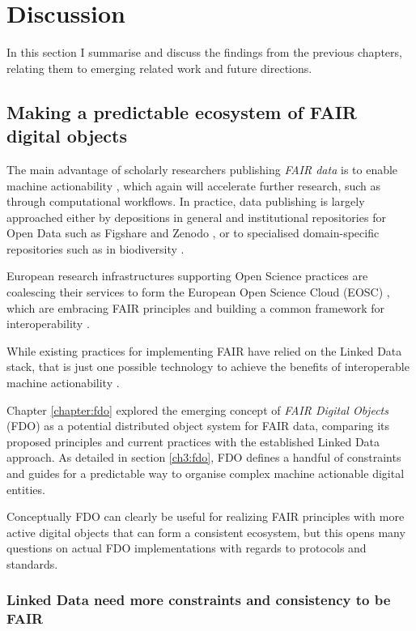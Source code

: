 \section{Discussion}
\label{ch61:discuss}

In this section I summarise and discuss the findings from the previous chapters, relating them to emerging related work and future directions.

\subsection{Making a predictable ecosystem of FAIR digital objects}
\label{ch61:ecosystem}

The main advantage of scholarly researchers publishing \emph{FAIR data} is to enable machine actionability \cite{Wilkinson 2016}, which again will accelerate further research, such as through computational workflows. 
In practice, data publishing is largely approached either by depositions in general and institutional repositories for Open Data such as Figshare and Zenodo \cite{Dillen 2019}, or to specialised domain-specific repositories such as in biodiversity \cite{ch8-7}. 

European research infrastructures supporting Open Science practices are coalescing their services to form the European Open Science Cloud (EOSC) \cite{10.2777/940154}, which are embracing FAIR principles \cite{Mons 2017} and building a common framework for interoperability \cite{eosc-interop-framework}. 

While existing practices for implementing FAIR have relied on the Linked Data stack, that is just one possible technology to achieve the benefits of interoperable machine actionability \cite{Mons 2017}. 

Chapter \ref{chapter:fdo} explored the emerging concept of \emph{FAIR Digital Objects} (FDO) \cite{Schultes 2019} as a potential distributed object system for FAIR data, comparing its proposed principles and current practices with the established Linked Data approach. 
As detailed in section \vref{ch3:fdo}, FDO defines a handful of constraints and guides for a predictable way to organise complex machine actionable digital entities. 

Conceptually FDO can clearly be useful for realizing FAIR principles with more active digital objects that can form a consistent ecosystem, but this opens many questions on actual FDO implementations with regards to protocols and standards.

\subsubsection{Linked Data need more constraints and consistency to be FAIR}
\label{ch61:constraints}

